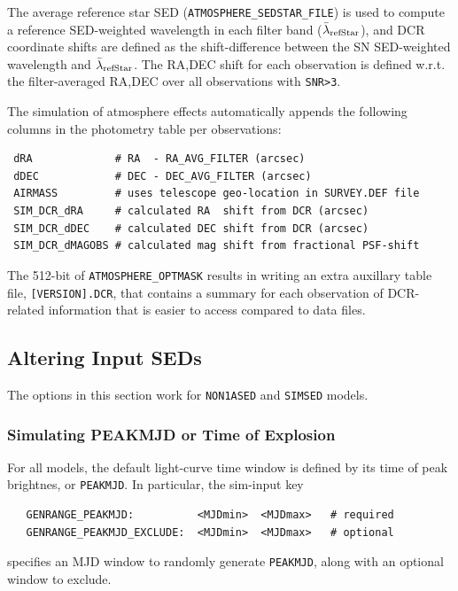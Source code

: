 \documentclass[12pt]{article}
\begin{document}
\newcommand{\lamrefStar}{$\bar{\lambda}_{\rm refStar}$}
The average reference star SED ({\tt ATMOSPHERE\_SEDSTAR\_FILE}) is used to
compute a reference SED-weighted wavelength in each filter band (\lamrefStar), 
and DCR coordinate shifts are defined as the shift-difference between 
the SN SED-weighted wavelength and \lamrefStar.
The RA,DEC shift for each observation is defined w.r.t.
the filter-averaged RA,DEC over all observations with {\tt SNR>3}.

The simulation of atmosphere effects automatically appends the following
columns in the photometry table per observations:
\begin{verbatim}
 dRA             # RA  - RA_AVG_FILTER (arcsec)
 dDEC            # DEC - DEC_AVG_FILTER (arcsec)
 AIRMASS         # uses telescope geo-location in SURVEY.DEF file
 SIM_DCR_dRA     # calculated RA  shift from DCR (arcsec)
 SIM_DCR_dDEC    # calculated DEC shift from DCR (arcsec)
 SIM_DCR_dMAGOBS # calculated mag shift from fractional PSF-shift
\end{verbatim}
%

The 512-bit of {\tt ATMOSPHERE\_OPTMASK} results in writing
an extra auxillary table file, {\tt [VERSION].DCR}, that contains a
summary for each observation of DCR-related information that is easier 
to access compared to data files.

\clearpage
\subsection{Altering Input SEDs}
\label{subsec:Alter_SED}

The options in this section work for 
{\tt NON1ASED} and {\tt SIMSED} models.

\subsubsection{Simulating PEAKMJD or Time of Explosion}
\label{sss:tpeak_or_texplode}


For all models, the default light-curve time window is
defined by its time of peak brightnes, or {\tt PEAKMJD}.
In particular, the sim-input key 
\begin{verbatim}
   GENRANGE_PEAKMJD:          <MJDmin>  <MJDmax>   # required
   GENRANGE_PEAKMJD_EXCLUDE:  <MJDmin>  <MJDmax>   # optional
\end{verbatim}
specifies an MJD window to randomly generate {\tt PEAKMJD},
along with an optional window to exclude.
\end{document}

